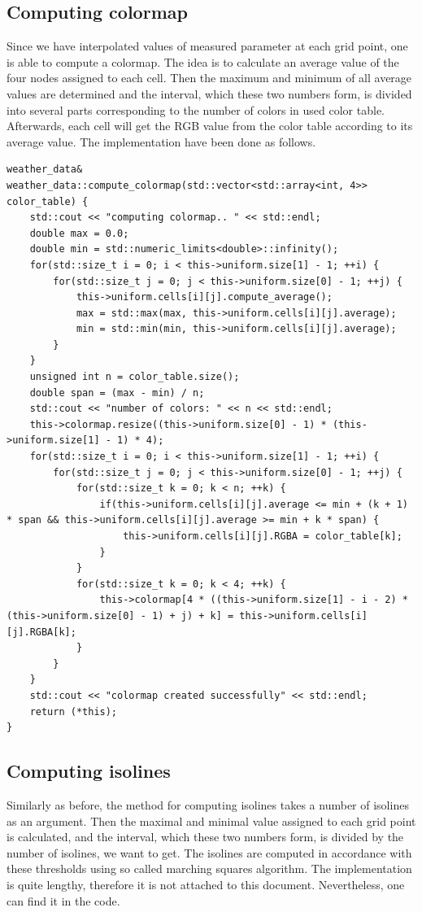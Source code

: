 \documentclass[a4paper, 10pt]{article}
\begin{document}
\subsection{Computing colormap}
Since we have interpolated values of measured parameter at each grid point, one is able to compute a colormap. The idea is to calculate an average value of the four nodes assigned to each cell. Then the maximum and minimum of all average values are determined and the interval, which these two numbers form, is divided into several parts corresponding to the number of colors in used color table. Afterwards, each cell will get the RGB value from the color table according to its average value. The implementation have been done as follows.   
\begin{lstlisting}[caption = method for computing a colormap]
weather_data& weather_data::compute_colormap(std::vector<std::array<int, 4>> color_table) {
	std::cout << "computing colormap.. " << std::endl;
	double max = 0.0;
	double min = std::numeric_limits<double>::infinity();
	for(std::size_t i = 0; i < this->uniform.size[1] - 1; ++i) {
		for(std::size_t j = 0; j < this->uniform.size[0] - 1; ++j) {
			this->uniform.cells[i][j].compute_average();
			max = std::max(max, this->uniform.cells[i][j].average);
			min = std::min(min, this->uniform.cells[i][j].average);
		}
	}
	unsigned int n = color_table.size();
	double span = (max - min) / n;
	std::cout << "number of colors: " << n << std::endl;
	this->colormap.resize((this->uniform.size[0] - 1) * (this->uniform.size[1] - 1) * 4);
	for(std::size_t i = 0; i < this->uniform.size[1] - 1; ++i) {
		for(std::size_t j = 0; j < this->uniform.size[0] - 1; ++j) {
			for(std::size_t k = 0; k < n; ++k) {
				if(this->uniform.cells[i][j].average <= min + (k + 1) * span && this->uniform.cells[i][j].average >= min + k * span) {
					this->uniform.cells[i][j].RGBA = color_table[k];
				}
			}
			for(std::size_t k = 0; k < 4; ++k) {
				this->colormap[4 * ((this->uniform.size[1] - i - 2) * (this->uniform.size[0] - 1) + j) + k] = this->uniform.cells[i][j].RGBA[k];
			}
		}
	}
	std::cout << "colormap created successfully" << std::endl;
	return (*this);
}
\end{lstlisting}

\subsection{Computing isolines}
Similarly as before, the method for computing isolines takes a number of isolines as an argument. Then the maximal and minimal value assigned to each grid point is calculated, and the interval, which these two numbers form, is divided by the number of isolines, we want to get. The isolines are computed in accordance with these thresholds using so called marching squares algorithm. The implementation is quite lengthy, therefore it is not attached to this document. Nevertheless, one can find it in the code.
\end{document}
